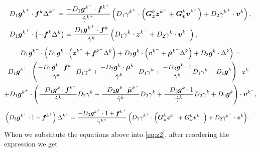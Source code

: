 \documentclass[DC2017114Bouma.tex]{subfiles}
\begin{document}
\begin{align}
&D_1{\boldsymbol{g}}^{k^+}\cdot{\boldsymbol{f}}^{k}\Delta^{k^+} = \frac{-D_1{\boldsymbol{g}}^{k^+}\cdot{\boldsymbol{f}}^{k^+}}{\dot{\gamma}^{k^+}}\left(D_1\gamma^{k^+}\cdot\left({\boldsymbol{G}}_{\boldsymbol{z}}^{k}{\boldsymbol{z}}^{k^-}+{\boldsymbol{G}}_{\boldsymbol{v}}^{k}{\boldsymbol{v}}^{k^-}\right) +D_2\gamma^{k^+}\cdot{\boldsymbol{v}}^{k}\right),\\
&D_1{\boldsymbol{g}}^{k^+}\cdot\left(-{\boldsymbol{f}}^{k}\Delta^{k}\right) = \frac{D_1{\boldsymbol{g}}^{k^+}\cdot{\boldsymbol{f}}^{k}}{\dot{\gamma}^{k}}\left(D_1\gamma^{k}\cdot{\boldsymbol{z}}^{k^-} + D_2\gamma^{k}\cdot{\boldsymbol{v}}^{k^-}\right),
\end{align}
\begin{multline}
D_1{\boldsymbol{g}}^{k^+}\cdot\left(D_1{\boldsymbol{g}}^{k}\cdot\left({\boldsymbol{z}}^{k^-} + {\boldsymbol{f}}^{k^-}\Delta^{k}\right) + D_2{\boldsymbol{g}}^{k}\cdot\left({\boldsymbol{v}}^{k^-}+\dot{\boldsymbol{\mu}}^{k^-}\Delta^{k}\right) + D_3{\boldsymbol{g}}^{k}\cdot\Delta^{k}\right) = \\
D_1{\boldsymbol{g}}^{k^+}\cdot\left(\frac{-D_1{\boldsymbol{g}}^{k}\cdot{\boldsymbol{f}}^{k^-}}{\dot{\gamma}^{k}}D_1\gamma^{k} + \frac{-D_2{\boldsymbol{g}}^{k}\cdot\dot{\boldsymbol{\mu}}^{k^-}}{\dot{\gamma}^{k}}D_1\gamma^{k} + \frac{-D_3{\boldsymbol{g}}^{k}\cdot 1}{\dot{\gamma}^{k}}D_1\gamma^{k} + D_1{\boldsymbol{g}}^{k}\right)\cdot{\boldsymbol{z}}^{k^-} \\
+ D_1{\boldsymbol{g}}^{k^+}\cdot\left(\frac{-D_1{\boldsymbol{g}}^{k}\cdot{\boldsymbol{f}}^{k^-}}{\dot{\gamma}^{k}}D_2\gamma^{k} + \frac{-D_2{\boldsymbol{g}}^{k}\cdot\dot{\boldsymbol{\mu}}^{k^-}}{\dot{\gamma}^{k}}D_2\gamma^{k} + \frac{-D_3{\boldsymbol{g}}^{k}\cdot 1}{\dot{\gamma}^{k}}D_2\gamma^{k} + D_2{\boldsymbol{g}}^{k} \right)\cdot {\boldsymbol{v}}^{k^-},
\end{multline}
\begin{align}
&\left(D_3{\boldsymbol{g}}^{k^+}\cdot 1 - {\boldsymbol{f}}^{k^+}\right)\Delta^{k^+} = \frac{-D_3{\boldsymbol{g}}^{k^+}\cdot 1+{\boldsymbol{f}}^{k^+}}{\dot{\gamma}^{k^+}}\left(D_1\gamma^{k^+}\cdot\left({\boldsymbol{G}}_{\boldsymbol{z}}^{k}{\boldsymbol{z}}^{k^-} + {\boldsymbol{G}}_{\boldsymbol{v}}^{k}{\boldsymbol{v}}^{k^-}\right) + D_2\gamma^{k^+}\cdot{\boldsymbol{v}}^{k}\right).
\end{align}
%
When we substitute the equations above into \eqref{eq:z2}, after reordering the expression we get
\end{document}

